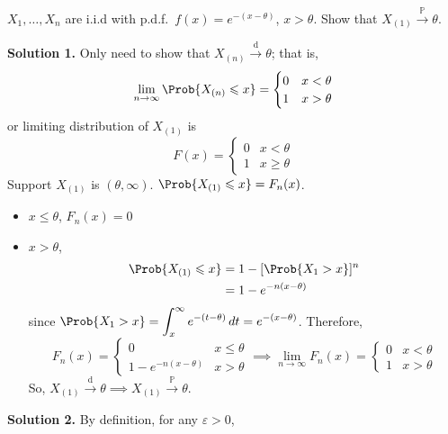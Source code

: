 \begin{Example}{}{}
    $ X_1,\ldots,X_n $ are i.i.d with p.d.f.\
    $ f(x)=e^{-(x-\theta)} $, $ x>\theta $. Show that
    $ X_{(1)}\stackrel{\mathbb{P}}{\to}\theta $.

    \textbf{Solution 1.} Only need to show that $ X_{(n)}\stackrel{\text{d}}{\to}\theta $;
    that is,
    \[ \lim\limits_{{n} \to {\infty}} \Prob{X_{(n)}\leqslant x}
        =\begin{cases}
            0 & x<\theta \\
            1 & x>\theta
        \end{cases} \]
    or limiting distribution of $ X_{(1)} $ is
    \[ F(x)=\begin{cases}
            0 & x< \theta         \\
            1 & x\geqslant \theta
        \end{cases} \]
    Support $ X_{(1)} $ is $ (\theta,\infty) $.
    $ \Prob{X_{(1)}\leqslant x}=F_n(x) $.
    \begin{itemize}
        \item $ x\leqslant \theta $, $ F_n(x)=0 $
        \item $ x>\theta $,
              \begin{align*}
                  \Prob{X_{(1)}\leqslant x}
                   & =1-[\Prob{X_1>x}]^n \\
                   & =1-e^{-n(x-\theta)}
              \end{align*}
              since
              $ \displaystyle  \Prob{X_1>x}=\int_{x}^{\infty} e^{-(t-\theta)}\, d{t}=
                  e^{-(x-\theta)}  $. Therefore,
              \[ F_n(x)=\begin{cases}
                      0                  & x\leqslant \theta \\
                      1-e^{-n(x-\theta)} & x>\theta
                  \end{cases}\implies
                  \lim\limits_{{n} \to {\infty}} F_n(x)=
                  \begin{cases}
                      0 & x<\theta \\
                      1 & x>\theta
                  \end{cases} \]
              So, $ X_{(1)}\stackrel{\text{d}}{\to}\theta\implies
                  X_{(1)}\stackrel{\mathbb{P}}{\to}\theta $.
    \end{itemize}
    \textbf{Solution 2.} By definition, for any $ \varepsilon>0 $,
    \begin{itemize}

\end{itemize}
\end{Example}
